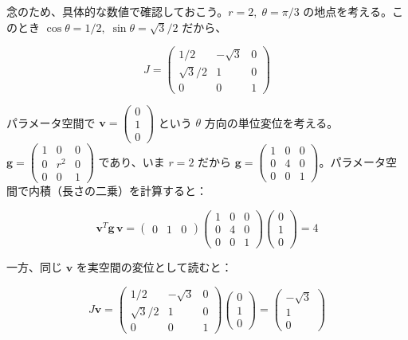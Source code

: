 \documentclass[a4paper,12pt,openany]{book}
\begin{document}
念のため、具体的な数値で確認しておこう。\(r=2,\; \theta=\pi/3\)
の地点を考える。このとき \(\cos\theta = 1/2,\; \sin\theta = \sqrt{3}/2\)
だから、

\[J = \begin{pmatrix}
1/2 & -\sqrt{3} & 0 \\
\sqrt{3}/2 & 1 & 0 \\
0 & 0 & 1
\end{pmatrix}\]

パラメータ空間で
\(\mathbf{v} = \begin{pmatrix}0 \\ 1 \\ 0\end{pmatrix}\) という
\(\theta\)
方向の単位変位を考える。\(\mathbf{g} = \begin{pmatrix} 1 & 0 & 0 \\ 0 & r^2 & 0 \\ 0 & 0 & 1 \end{pmatrix}\)
であり、いま \(r=2\) だから
\(\mathbf{g} = \begin{pmatrix} 1 & 0 & 0 \\ 0 & 4 & 0 \\ 0 & 0 & 1 \end{pmatrix}\)。パラメータ空間で内積（長さの二乗）を計算すると：

\[\mathbf{v}^T \mathbf{g} \,\mathbf{v} = \begin{pmatrix} 0 & 1 & 0 \end{pmatrix}
\begin{pmatrix} 1 & 0 & 0 \\ 0 & 4 & 0 \\ 0 & 0 & 1 \end{pmatrix}
\begin{pmatrix} 0 \\ 1 \\ 0 \end{pmatrix} = 4\]

一方、同じ \(\mathbf{v}\) を実空間の変位として読むと：

\[J\mathbf{v} = \begin{pmatrix}
1/2 & -\sqrt{3} & 0 \\
\sqrt{3}/2 & 1 & 0 \\
0 & 0 & 1
\end{pmatrix}
\begin{pmatrix} 0 \\ 1 \\ 0 \end{pmatrix} = \begin{pmatrix} -\sqrt{3} \\ 1 \\ 0 \end{pmatrix}\]
\end{document}
